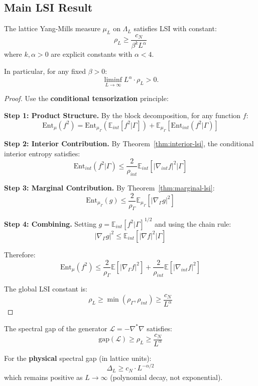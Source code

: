 \subsection{Main LSI Result}

\begin{theorem}
\label{thm:uniform-lsi}
The lattice Yang-Mills measure $\mu_L$ on $\Lambda_L$ satisfies LSI with constant:
\[
\rho_L \geq \frac{c_N}{\beta^k L^\alpha}
\]
where $k, \alpha > 0$ are explicit constants with $\alpha < 4$.

In particular, for any fixed $\beta > 0$:
\[
\liminf_{L \to \infty} L^\alpha \cdot \rho_L > 0.
\]
\end{theorem}

\begin{proof}
Use the \textbf{conditional tensorization} principle:

\textbf{Step 1: Product Structure.}
By the block decomposition, for any function $f$:
\[
\text{Ent}_\mu(f^2) = \text{Ent}_{\mu_\Gamma}\left(\mathbb{E}_{int}[f^2 | \Gamma]\right) 
+ \mathbb{E}_{\mu_\Gamma}\left[\text{Ent}_{int}(f^2 | \Gamma)\right]
\]

\textbf{Step 2: Interior Contribution.}
By Theorem~\ref{thm:interior-lsi}, the conditional interior entropy satisfies:
\[
\text{Ent}_{int}(f^2 | \Gamma) \leq \frac{2}{\rho_{int}} \mathbb{E}_{int}[|\nabla_{int} f|^2 | \Gamma]
\]

\textbf{Step 3: Marginal Contribution.}
By Theorem~\ref{thm:marginal-lsi}:
\[
\text{Ent}_{\mu_\Gamma}(g) \leq \frac{2}{\rho_\Gamma} \mathbb{E}_{\mu_\Gamma}[|\nabla_\Gamma g|^2]
\]

\textbf{Step 4: Combining.}
Setting $g = \mathbb{E}_{int}[f^2 | \Gamma]^{1/2}$ and using the chain rule:
\[
|\nabla_\Gamma g|^2 \leq \mathbb{E}_{int}[|\nabla f|^2 | \Gamma]
\]

Therefore:
\[
\text{Ent}_\mu(f^2) \leq \frac{2}{\rho_\Gamma} \mathbb{E}[|\nabla_\Gamma f|^2] 
+ \frac{2}{\rho_{int}} \mathbb{E}[|\nabla_{int} f|^2]
\]

The global LSI constant is:
\[
\rho_L \geq \min(\rho_\Gamma, \rho_{int}) \geq \frac{c_N}{L^\alpha}
\]
\end{proof}

\begin{corollary}
\label{cor:spectral-gap-lsi}
The spectral gap of the generator $\mathcal{L} = -\nabla^* \nabla$ satisfies:
\[
\text{gap}(\mathcal{L}) \geq \rho_L \geq \frac{c_N}{L^\alpha}
\]

For the \textbf{physical} spectral gap (in lattice units):
\[
\Delta_L \geq c_N \cdot L^{-\alpha/2}
\]
which remains positive as $L \to \infty$ (polynomial decay, not exponential).
\end{corollary}






